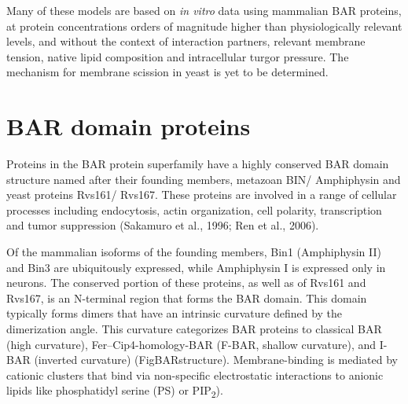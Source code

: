			\vspace{5mm}
Many of these models are based on \textit{in vitro} data using mammalian BAR proteins, at protein concentrations orders of magnitude higher than physiologically relevant levels, and without the context of interaction partners, relevant membrane tension, native lipid composition and intracellular turgor pressure. The mechanism for membrane scission in yeast is yet to be determined. 

 




\newpage
		
\section{BAR domain proteins}
	
Proteins in the BAR protein superfamily have a highly conserved BAR domain structure named after their founding members, metazoan BIN/ Amphiphysin and yeast proteins Rvs161/ Rvs167. These proteins are involved in a range of cellular processes including endocytosis, actin organization, cell polarity, transcription and tumor suppression (Sakamuro et al., 1996; Ren et al., 2006). 

Of the mammalian isoforms of the founding members, Bin1 (Amphiphysin II) and Bin3 are ubiquitously expressed, while Amphiphysin I is expressed only in neurons. The conserved portion of these proteins, as well as of Rvs161 and Rvs167, is an N-terminal region that forms the BAR domain. This domain typically forms dimers that have an intrinsic curvature defined by the dimerization angle. This curvature categorizes BAR proteins to classical BAR (high curvature), Fer–Cip4-homology-BAR (F-BAR, shallow curvature), and I-BAR (inverted curvature) (FigBARstructure). Membrane-binding is mediated by cationic clusters that bind via non-specific electrostatic interactions to anionic lipids like phosphatidyl serine (PS) or PIP\textsubscript{2}).


\vspace{0.5mm}

